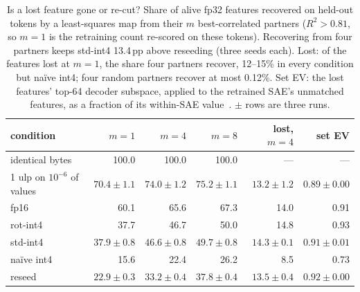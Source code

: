 \begin{table}[htbp]
\caption{Is a lost feature gone or re-cut? Share of alive fp32 features recovered on held-out tokens by a least-squares map from their $m$ best-correlated partners ($R^2 > 0.81$, so $m{=}1$ is the retraining count re-scored on these tokens). Recovering from four partners keeps std-int4 13.4\,pp above reseeding (three seeds each). Lost: of the features lost at $m{=}1$, the share four partners recover, 12--15\% in every condition but na\"ive int4; four random partners recover at most 0.12\%. Set EV: the lost features' top-64 decoder subspace, applied to the retrained SAE's unmatched features, as a fraction of its within-SAE value~\citep{reprosubspaces}. $\pm$ rows are three runs.}
\label{tab:subspace}
\centering\small
\begin{tabular}{lrrrrr}
\toprule
condition & $m{=}1$ & $m{=}4$ & $m{=}8$ & lost, $m{=}4$ & set EV \\
\midrule
identical bytes & 100.0 & 100.0 & 100.0 & --- & --- \\
1 ulp on $10^{-6}$ of values & $70.4 \pm 1.1$ & $74.0 \pm 1.2$ & $75.2 \pm 1.1$ & $13.2 \pm 1.2$ & $0.89 \pm 0.00$ \\
fp16 & 60.1 & 65.6 & 67.3 & 14.0 & 0.91 \\
rot-int4 & 37.7 & 46.7 & 50.0 & 14.8 & 0.93 \\
std-int4 & $37.9 \pm 0.8$ & $46.6 \pm 0.8$ & $49.7 \pm 0.8$ & $14.3 \pm 0.1$ & $0.91 \pm 0.01$ \\
na\"ive int4 & 15.6 & 22.4 & 26.2 & 8.5 & 0.73 \\
reseed & $22.9 \pm 0.3$ & $33.2 \pm 0.4$ & $37.8 \pm 0.4$ & $13.5 \pm 0.4$ & $0.92 \pm 0.00$ \\
\bottomrule
\end{tabular}
\end{table}

